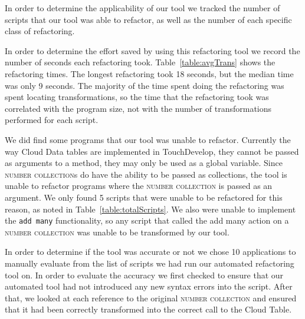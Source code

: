 \documentclass{sigplanconf}
\begin{document}
In order to determine the applicability of our tool we tracked the number of scripts that our tool was able to refactor, as well as the number of each specific class of refactoring.

In order to determine the effort saved by using this refactoring tool we record the number of seconds each refactoring took. Table~\ref{table:avgTrans} shows  the refactoring times.  The longest refactoring took 18 seconds, but the median time was only 9 seconds.  The majority of the time spent doing the refactoring was spent locating transformations, so the time that the refactoring took was correlated with the program size, not with the number of transformations performed for each script.

We did find some programs that our tool was unable to refactor.  Currently the way Cloud Data tables are implemented in TouchDevelop, they cannot be passed as arguments to a method, they may only be used as a global variable.  Since \textsc{number collection}s do have the ability to be passed as collections, the tool is unable to refactor programs where the \textsc{number collection} is passed as an argument.  We only found 5 scripts that were unable to be refactored for this reason, as noted in Table~\ref{table:totalScripts}.  We also were unable to implement the \texttt{add many} functionality, so any script that called the add many action on a \textsc{number collection} was unable to be transformed by our tool. 

In order to determine if the tool was accurate or not we chose 10 applications to manually evaluate from the list of scripts we had run our automated refactoring tool on.  In order to evaluate the accuracy we first checked to ensure that our automated tool had not introduced any new syntax errors into the script.  After that, we looked at each reference to the original \textsc{number collection} and ensured that it had been correctly transformed into the correct call to the Cloud Table.
\end{document}
